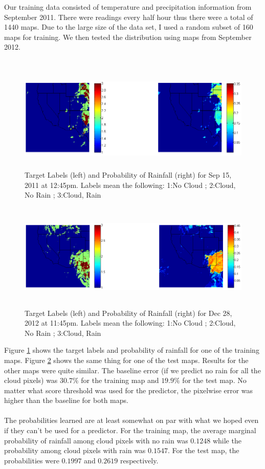 Our training data consisted of temperature and precipitation information from September 2011. There were readings every half hour thus there were a total of 1440 maps. Due to the large size of the data set, I used a random subset of 160 maps for training. We then tested the distribution using maps from September 2012. \\
\\
\begin{figure}[t]
\centering
\includegraphics[height=2in]{./zackWriteUp/time698_sep2011_labelAndProb.png}
\caption{Target Labels (left) and Probability of Rainfall (right) for Sep 15, 2011 at 12:45pm. Labels mean the following: 1:No Cloud ; 2:Cloud, No Rain ; 3:Cloud, Rain}
\label{labelProb2}
\end{figure}
\begin{figure}[t]
\centering
\includegraphics[height=2in]{./zackWriteUp/time1196_labelAndProb.png}
\caption{Target Labels (left) and Probability of Rainfall (right) for Dec 28, 2012 at 11:45pm. Labels mean the following: 1:No Cloud ; 2:Cloud, No Rain ; 3:Cloud, Rain}
\label{labelProb}
\end{figure}
Figure \ref{labelProb2} shows the target labels and probability of rainfall for one of the training maps. Figure \ref{labelProb} shows the same thing for one of the test maps. Results for the other maps were quite similar. The baseline error (if we predict no rain for all the cloud pixels) was $30.7\%$ for the training map and $19.9\%$ for the test map. No matter what score threshold was used for the predictor, the pixelwise error was higher than the baseline for both maps. \\
\\
The probabilities learned are at least somewhat on par with what we hoped even if they can't be used for a predictor. For the training map, the average marginal probability of rainfall among cloud pixels with no rain was $0.1248$ while the probability among cloud pixels with rain was $0.1547$. For the test map, the probabilities were $0.1997$ and $0.2619$ respectively.  



